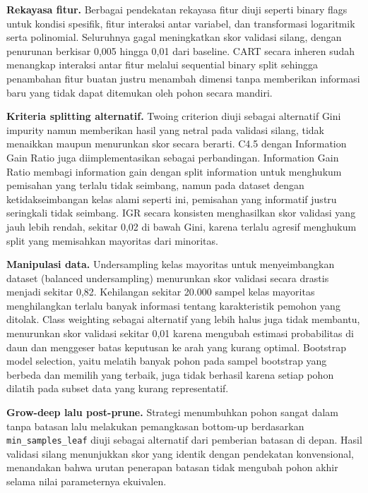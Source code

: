 \documentclass{article}
\begin{document}
\textbf{Rekayasa fitur.} Berbagai pendekatan rekayasa fitur diuji seperti binary flags untuk kondisi spesifik, fitur interaksi antar variabel, dan transformasi logaritmik serta polinomial. Seluruhnya gagal meningkatkan skor validasi silang, dengan penurunan berkisar 0,005 hingga 0,01 dari baseline. CART secara inheren sudah menangkap interaksi antar fitur melalui sequential binary split sehingga penambahan fitur buatan justru menambah dimensi tanpa memberikan informasi baru yang tidak dapat ditemukan oleh pohon secara mandiri.

\textbf{Kriteria splitting alternatif.} Twoing criterion diuji sebagai alternatif Gini impurity namun memberikan hasil yang netral pada validasi silang, tidak menaikkan maupun menurunkan skor secara berarti. C4.5 dengan Information Gain Ratio juga diimplementasikan sebagai perbandingan. Information Gain Ratio membagi information gain dengan split information untuk menghukum pemisahan yang terlalu tidak seimbang, namun pada dataset dengan ketidakseimbangan kelas alami seperti ini, pemisahan yang informatif justru seringkali tidak seimbang. IGR secara konsisten menghasilkan skor validasi yang jauh lebih rendah, sekitar 0,02 di bawah Gini, karena terlalu agresif menghukum split yang memisahkan mayoritas dari minoritas.

\textbf{Manipulasi data.} Undersampling kelas mayoritas untuk menyeimbangkan dataset (balanced undersampling) menurunkan skor validasi secara drastis menjadi sekitar 0,82. Kehilangan sekitar 20.000 sampel kelas mayoritas menghilangkan terlalu banyak informasi tentang karakteristik pemohon yang ditolak. Class weighting sebagai alternatif yang lebih halus juga tidak membantu, menurunkan skor validasi sekitar 0,01 karena mengubah estimasi probabilitas di daun dan menggeser batas keputusan ke arah yang kurang optimal. Bootstrap model selection, yaitu melatih banyak pohon pada sampel bootstrap yang berbeda dan memilih yang terbaik, juga tidak berhasil karena setiap pohon dilatih pada subset data yang kurang representatif.

\textbf{Grow-deep lalu post-prune.} Strategi menumbuhkan pohon sangat dalam tanpa batasan lalu melakukan pemangkasan bottom-up berdasarkan \texttt{min\_samples\_leaf} diuji sebagai alternatif dari pemberian batasan di depan. Hasil validasi silang menunjukkan skor yang identik dengan pendekatan konvensional, menandakan bahwa urutan penerapan batasan tidak mengubah pohon akhir selama nilai parameternya ekuivalen.

\end{document}

